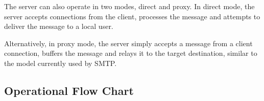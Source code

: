 The server can also operate in two modes, direct and proxy. In direct
mode, the server accepts connections from the client, processes the
message and attempts to deliver the message to a local user.


Alternatively, in proxy mode, the server simply accepts a message from a
client connection, buffers the message and relays it to the target 
destination, similar to the model currently used by SMTP.

\subsection{Operational Flow Chart}



\clearpage 

